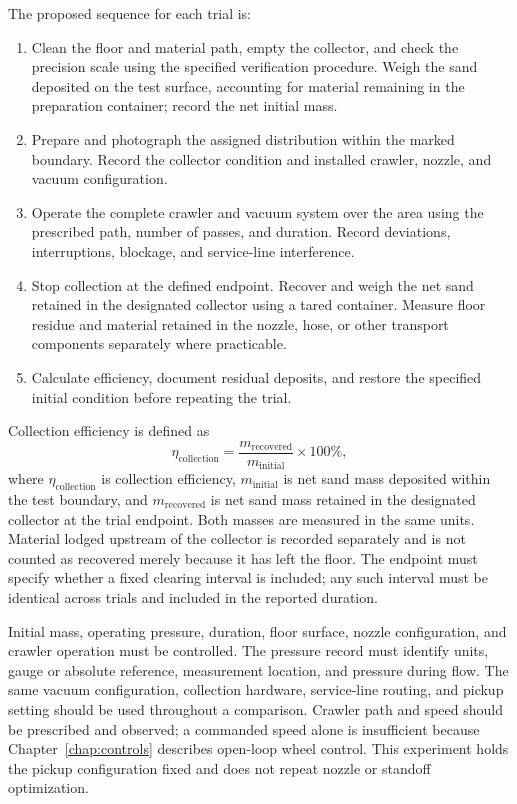 The proposed sequence for each trial is:
\begin{enumerate}
\item Clean the floor and material path, empty the collector, and check the precision scale using the specified verification procedure. Weigh the sand deposited on the test surface, accounting for material remaining in the preparation container; record the net initial mass.
\item Prepare and photograph the assigned distribution within the marked boundary. Record the collector condition and installed crawler, nozzle, and vacuum configuration.
\item Operate the complete crawler and vacuum system over the area using the prescribed path, number of passes, and duration. Record deviations, interruptions, blockage, and service-line interference.
\item Stop collection at the defined endpoint. Recover and weigh the net sand retained in the designated collector using a tared container. Measure floor residue and material retained in the nozzle, hose, or other transport components separately where practicable.
\item Calculate efficiency, document residual deposits, and restore the specified initial condition before repeating the trial.
\end{enumerate}

Collection efficiency is defined as
\begin{equation}
\eta_{\mathrm{collection}}=\frac{m_{\mathrm{recovered}}}{m_{\mathrm{initial}}}\times100\% ,
\label{eq:recovery}
\end{equation}
where $\eta_{\mathrm{collection}}$ is collection efficiency, $m_{\mathrm{initial}}$ is net sand mass deposited within the test boundary, and $m_{\mathrm{recovered}}$ is net sand mass retained in the designated collector at the trial endpoint. Both masses are measured in the same units. Material lodged upstream of the collector is recorded separately and is not counted as recovered merely because it has left the floor. The endpoint must specify whether a fixed clearing interval is included; any such interval must be identical across trials and included in the reported duration.

Initial mass, operating pressure, duration, floor surface, nozzle configuration, and crawler operation must be controlled. The pressure record must identify units, gauge or absolute reference, measurement location, and pressure during flow. The same vacuum configuration, collection hardware, service-line routing, and pickup setting should be used throughout a comparison. Crawler path and speed should be prescribed and observed; a commanded speed alone is insufficient because Chapter~\ref{chap:controls} describes open-loop wheel control. This experiment holds the pickup configuration fixed and does not repeat nozzle or standoff optimization.

